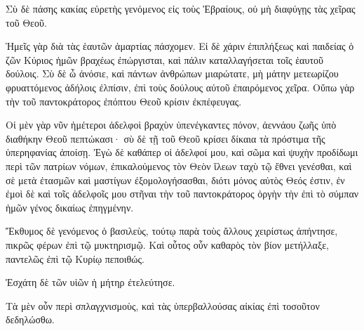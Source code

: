{Σὺ δὲ πάσης κακίας εὑρετὴς γενόμενος εἰς τοὺς Ἑβραίους, οὐ μὴ διαφύγῃς τὰς χεῖρας τοῦ Θεοῦ.
\par }{\PP {}Ἡμεῖς γὰρ διὰ τὰς ἑαυτῶν ἁμαρτίας πάσχομεν.
Εἰ δὲ χάριν ἐπιπλήξεως καὶ παιδείας ὁ ζῶν Κύριος ἡμῶν βραχέως ἐπώργισται, καὶ πάλιν καταλλαγήσεται τοῖς ἑαυτοῦ δούλοις.
Σὺ δὲ ὦ ἀνόσιε, καὶ πάντων ἀνθρώπων μιαρώτατε, μὴ μάτην μετεωρίζου φρυαττόμενος ἀδήλοις ἐλπίσιν, ἐπὶ τοὺς δούλους αὐτοῦ ἐπαιρόμενος χεῖρα.
Οὔπω γὰρ τὴν τοῦ παντοκράτορος ἐπόπτου Θεοῦ κρίσιν ἐκπέφευγας.
\par }{\PP {}Οἱ μὲν γὰρ νῦν ἡμέτεροι ἀδελφοὶ βραχὺν ὑπενέγκαντες πόνον, ἀεννάου ζωῆς ὑπὸ διαθήκην Θεοῦ πεπτώκασι· σὺ δὲ τῇ τοῦ Θεοῦ κρίσει δίκαια τὰ πρόστιμα τῆς ὑπερηφανίας ἀποίσῃ.
Ἐγὼ δὲ καθάπερ οἱ ἀδελφοί μου, καὶ σῶμα καὶ ψυχὴν προδίδωμι περὶ τῶν πατρίων νόμων, ἐπικαλούμενος τὸν Θεὸν ἵλεων ταχὺ τῷ ἔθνει γενέσθαι, καὶ σὲ μετὰ ἐτασμῶν καὶ μαστίγων ἐξομολογήσασθαι, διότι μόνος αὐτὸς Θεός ἐστιν,
ἐν ἐμοὶ δὲ καὶ τοῖς ἀδελφοῖς μου στῆναι τὴν τοῦ παντοκράτορος ὀργὴν τὴν ἐπὶ τὸ σύμπαν ἡμῶν γένος δικαίως ἐπηγμένην.
\par }{\PP {}Ἔκθυμος δὲ γενόμενος ὁ βασιλεὺς, τούτῳ παρὰ τοὺς ἄλλους χειρίστως ἀπήντησε, πικρῶς φέρων ἐπὶ τῷ μυκτηρισμῷ.
Καὶ οὗτος οὖν καθαρὸς τὸν βίον μετήλλαξε, παντελῶς ἐπὶ τῷ Κυρίῳ πεποιθώς.
\par }{\PP {}Ἐσχάτη δὲ τῶν υἱῶν ἡ μήτηρ ἐτελεύτησε.
\par }{\PP {}Τὰ μὲν οὖν περὶ σπλαγχνισμοὺς, καὶ τὰς ὑπερβαλλούσας αἰκίας ἐπὶ τοσοῦτον δεδηλώσθω.

}
